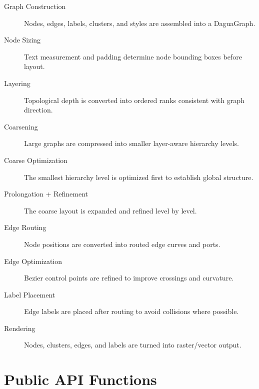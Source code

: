 \documentclass[11pt]{article}
\begin{document}
\begin{description}\item[Graph Construction] Nodes, edges, labels, clusters, and styles are assembled into a DaguaGraph.\item[Node Sizing] Text measurement and padding determine node bounding boxes before layout.\item[Layering] Topological depth is converted into ordered ranks consistent with graph direction.\item[Coarsening] Large graphs are compressed into smaller layer-aware hierarchy levels.\item[Coarse Optimization] The smallest hierarchy level is optimized first to establish global structure.\item[Prolongation + Refinement] The coarse layout is expanded and refined level by level.\item[Edge Routing] Node positions are converted into routed edge curves and ports.\item[Edge Optimization] Bezier control points are refined to improve crossings and curvature.\item[Label Placement] Edge labels are placed after routing to avoid collisions where possible.\item[Rendering] Nodes, clusters, edges, and labels are turned into raster/vector output.\end{description}\section{Public API Functions}
\end{document}
